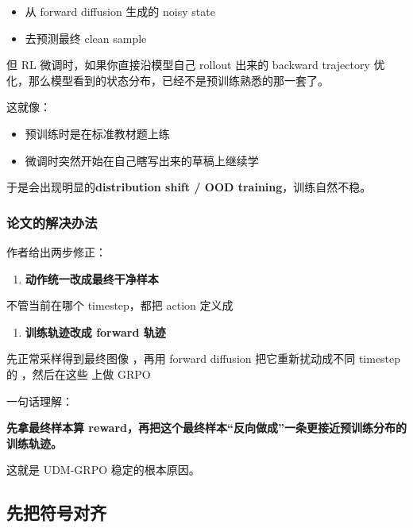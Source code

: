 \begin{itemize}[leftmargin=1.5em]
  \item 从 forward diffusion 生成的 noisy state 
  \item 去预测最终 clean sample 
\end{itemize}

但 RL 微调时，如果你直接沿模型自己 rollout 出来的 backward trajectory 优化，那么模型看到的状态分布，已经不是预训练熟悉的那一套了。

这就像：

\begin{itemize}[leftmargin=1.5em]
  \item 预训练时是在标准教材题上练
  \item 微调时突然开始在自己瞎写出来的草稿上继续学
\end{itemize}

于是会出现明显的\textbf{distribution shift / OOD training}，训练自然不稳。

\subsubsection{论文的解决办法}

作者给出两步修正：

\begin{enumerate}[leftmargin=1.5em]
  \item \textbf{动作统一改成最终干净样本}
\end{enumerate}

不管当前在哪个 timestep，都把 action 定义成 

\begin{enumerate}[leftmargin=1.5em]
  \item \textbf{训练轨迹改成 forward 轨迹}
\end{enumerate}

先正常采样得到最终图像 ，再用 forward diffusion 把它重新扰动成不同 timestep 的 ，然后在这些  上做 GRPO

一句话理解：

\textbf{先拿最终样本算 reward，再把这个最终样本“反向做成”一条更接近预训练分布的训练轨迹。}

这就是 UDM-GRPO 稳定的根本原因。

\subsection{先把符号对齐}


